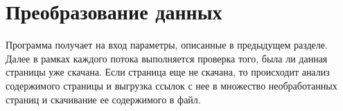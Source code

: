 \chapter{Преобразование данных}

Программа получает на вход параметры, описанные в предыдущем разделе. Далее в рамках каждого потока выполняется проверка того, была ли данная страницы уже скачана. Если страница еще не скачана, то происходит анализ содержимого страницы и выгрузка ссылок с нее в множество необработанных страниц и скачивание ее содержимого в файл.
